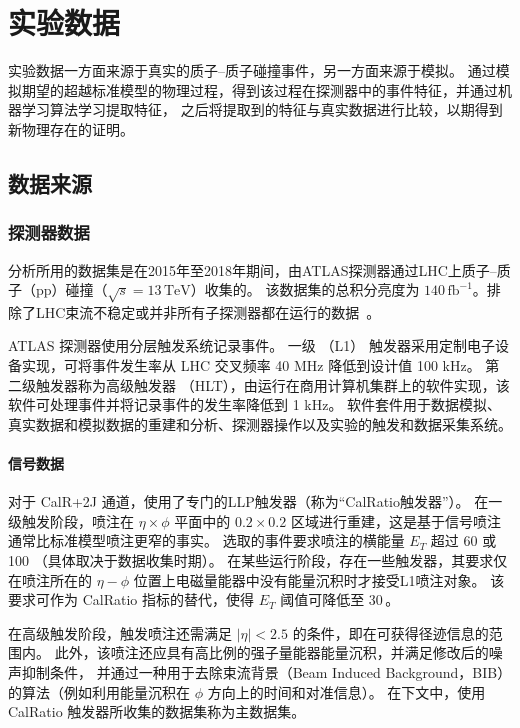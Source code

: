 
\chapter{实验数据}
实验数据一方面来源于真实的质子--质子碰撞事件，另一方面来源于模拟。
通过模拟期望的超越标准模型的物理过程，得到该过程在探测器中的事件特征，并通过机器学习算法学习提取特征，
之后将提取到的特征与真实数据进行比较，以期得到新物理存在的证明。

\section{数据来源}

\subsection{探测器数据}
\label{sec:detector_data}

分析所用的数据集是在2015年至2018年期间，由ATLAS探测器通过LHC上质子--质子（pp）碰撞（$\sqrt{s} = 13\,\mathrm{TeV}$）收集的。
该数据集的总积分亮度为 $140\,\mathrm{fb}^{-1}$。排除了LHC束流不稳定或并非所有子探测器都在运行的数据~\cite{ATLAS_data_quality}。

ATLAS 探测器使用分层触发系统记录事件。
一级 （L1） 触发器采用定制电子设备实现，可将事件发生率从 LHC 交叉频率 40 MHz 降低到设计值 100 kHz。
第二级触发器称为高级触发器 （HLT），由运行在商用计算机集群上的软件实现，该软件可处理事件并将记录事件的发生率降低到 1 kHz。
软件套件用于数据模拟、真实数据和模拟数据的重建和分析、探测器操作以及实验的触发和数据采集系统。


\subsubsection{信号数据}
对于 CalR+2J 通道，使用了专门的LLP触发器（称为“CalRatio触发器”）。
在一级触发阶段，喷注在 $\eta \times \phi$ 平面中的 $0.2 \times 0.2$ 区域进行重建，这是基于信号喷注通常比标准模型喷注更窄的事实。
选取的事件要求喷注的横能量 $E_T$ 超过 60 \GeV 或 100 \GeV（具体取决于数据收集时期）。
在某些运行阶段，存在一些触发器，其要求仅在喷注所在的 $\eta - \phi$ 位置上电磁量能器中没有能量沉积时才接受L1喷注对象。
该要求可作为 CalRatio 指标的替代，使得 $E_T$ 阈值可降低至 30\,\GeV。

在高级触发阶段，触发喷注还需满足 $|\eta| < 2.5$ 的条件，即在可获得径迹信息的范围内。
此外，该喷注还应具有高比例的强子量能器能量沉积，并满足修改后的噪声抑制条件，
并通过一种用于去除束流背景（Beam Induced Background，BIB）的算法（例如利用能量沉积在 $\phi$ 方向上的时间和对准信息）。
在下文中，使用 CalRatio 触发器所收集的数据集称为主数据集。

